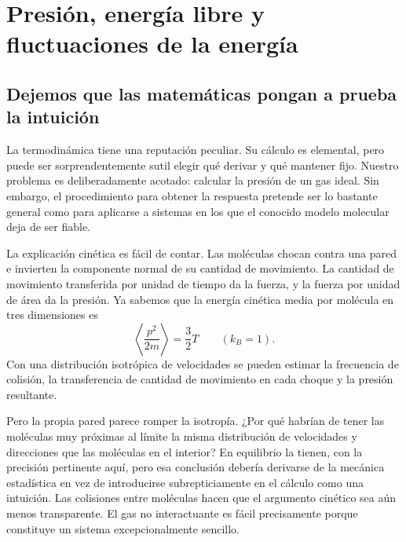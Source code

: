 \chapter{Presión, energía libre y fluctuaciones de la energía}


\section{Dejemos que las matemáticas pongan a prueba la intuición}

La termodinámica tiene una reputación peculiar. Su cálculo es elemental, pero puede ser sorprendentemente sutil elegir qué derivar y qué mantener fijo. Nuestro problema es deliberadamente acotado: calcular la presión de un gas ideal. Sin embargo, el procedimiento para obtener la respuesta pretende ser lo bastante general como para aplicarse a sistemas en los que el conocido modelo molecular deja de ser fiable.

La explicación cinética es fácil de contar. Las moléculas chocan contra una pared e invierten la componente normal de su cantidad de movimiento. La cantidad de movimiento transferida por unidad de tiempo da la fuerza, y la fuerza por unidad de área da la presión. Ya sabemos que la energía cinética media por molécula en tres dimensiones es \begin{equation}
 \left\langle \frac{p^2}{2m}\right\rangle=\frac{3}{2}T
 \qquad (k_B=1).
 \label{eq:sm5-mean-kinetic-energy}
\end{equation} Con una distribución isotrópica de velocidades se pueden estimar la frecuencia de colisión, la transferencia de cantidad de movimiento en cada choque y la presión resultante.

Pero la propia pared parece romper la isotropía. ¿Por qué habrían de tener las moléculas muy próximas al límite la misma distribución de velocidades y direcciones que las moléculas en el interior? En equilibrio la tienen, con la precisión pertinente aquí, pero esa conclusión debería derivarse de la mecánica estadística en vez de introducirse subrepticiamente en el cálculo como una intuición. Las colisiones entre moléculas hacen que el argumento cinético sea aún menos transparente. El gas no interactuante es fácil precisamente porque constituye un sistema excepcionalmente sencillo.

